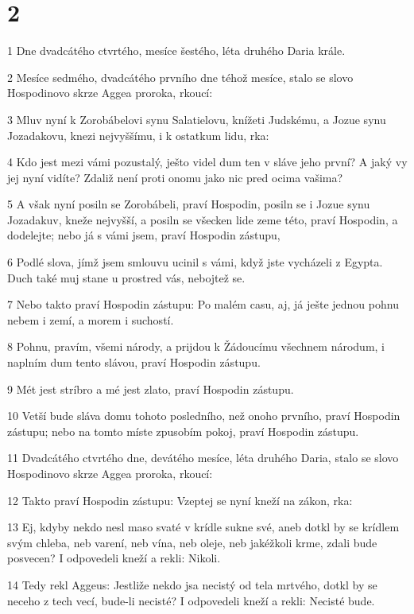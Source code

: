 \chapter{2}

\par 1 Dne dvadcátého ctvrtého, mesíce šestého, léta druhého Daria krále.
\par 2 Mesíce sedmého, dvadcátého prvního dne téhož mesíce, stalo se slovo Hospodinovo skrze Aggea proroka, rkoucí:
\par 3 Mluv nyní k Zorobábelovi synu Salatielovu, knížeti Judskému, a Jozue synu Jozadakovu, knezi nejvyššímu, i k ostatkum lidu, rka:
\par 4 Kdo jest mezi vámi pozustalý, ješto videl dum ten v sláve jeho první? A jaký vy jej nyní vidíte? Zdaliž není proti onomu jako nic pred ocima vašima?
\par 5 A však nyní posiln se Zorobábeli, praví Hospodin, posiln se i Jozue synu Jozadakuv, kneže nejvyšší, a posiln se všecken lide zeme této, praví Hospodin, a dodelejte; nebo já s vámi jsem, praví Hospodin zástupu,
\par 6 Podlé slova, jímž jsem smlouvu ucinil s vámi, když jste vycházeli z Egypta. Duch také muj stane u prostred vás, nebojtež se.
\par 7 Nebo takto praví Hospodin zástupu: Po malém casu, aj, já ješte jednou pohnu nebem i zemí, a morem i suchostí.
\par 8 Pohnu, pravím, všemi národy, a prijdou k Žádoucímu všechnem národum, i naplním dum tento slávou, praví Hospodin zástupu.
\par 9 Mét jest stríbro a mé jest zlato, praví Hospodin zástupu.
\par 10 Vetší bude sláva domu tohoto posledního, než onoho prvního, praví Hospodin zástupu; nebo na tomto míste zpusobím pokoj, praví Hospodin zástupu.
\par 11 Dvadcátého ctvrtého dne, devátého mesíce, léta druhého Daria, stalo se slovo Hospodinovo skrze Aggea proroka, rkoucí:
\par 12 Takto praví Hospodin zástupu: Vzeptej se nyní kneží na zákon, rka:
\par 13 Ej, kdyby nekdo nesl maso svaté v krídle sukne své, aneb dotkl by se krídlem svým chleba, neb varení, neb vína, neb oleje, neb jakéžkoli krme, zdali bude posvecen? I odpovedeli kneží a rekli: Nikoli.
\par 14 Tedy rekl Aggeus: Jestliže nekdo jsa necistý od tela mrtvého, dotkl by se neceho z tech vecí, bude-li necisté? I odpovedeli kneží a rekli: Necisté bude.
